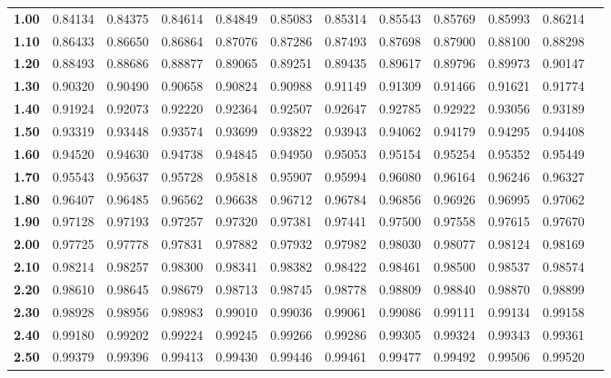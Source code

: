 \documentclass[a4paper]{article}
\begin{document}
\begin{tabular}{l|lllllllllll}
\bfseries  1.00&   0.84134&   0.84375&   0.84614&   0.84849&   0.85083&   0.85314&   0.85543&   0.85769&   0.85993&   0.86214&\\ 
\bfseries  1.10&   0.86433&   0.86650&   0.86864&   0.87076&   0.87286&   0.87493&   0.87698&   0.87900&   0.88100&   0.88298&\\
\bfseries  1.20&   0.88493&   0.88686&   0.88877&   0.89065&   0.89251&   0.89435&   0.89617&   0.89796&   0.89973&   0.90147&\\
\bfseries  1.30&   0.90320&   0.90490&   0.90658&   0.90824&   0.90988&   0.91149&   0.91309&   0.91466&   0.91621&   0.91774&\\ 
\bfseries  1.40&   0.91924&   0.92073&   0.92220&   0.92364&   0.92507&   0.92647&   0.92785&   0.92922&   0.93056&   0.93189&\\ \hline
\bfseries  1.50&   0.93319&   0.93448&   0.93574&   0.93699&   0.93822&   0.93943&   0.94062&   0.94179&   0.94295&   0.94408&\\
\bfseries  1.60&   0.94520&   0.94630&   0.94738&   0.94845&   0.94950&   0.95053&   0.95154&   0.95254&   0.95352&   0.95449&\\ 
\bfseries  1.70&   0.95543&   0.95637&   0.95728&   0.95818&   0.95907&   0.95994&   0.96080&   0.96164&   0.96246&   0.96327&\\
\bfseries  1.80&   0.96407&   0.96485&   0.96562&   0.96638&   0.96712&   0.96784&   0.96856&   0.96926&   0.96995&   0.97062&\\ 
\bfseries  1.90&   0.97128&   0.97193&   0.97257&   0.97320&   0.97381&   0.97441&   0.97500&   0.97558&   0.97615&   0.97670&\\ \hline
\bfseries  2.00&   0.97725&   0.97778&   0.97831&   0.97882&   0.97932&   0.97982&   0.98030&   0.98077&   0.98124&   0.98169&\\
\bfseries  2.10&   0.98214&   0.98257&   0.98300&   0.98341&   0.98382&   0.98422&   0.98461&   0.98500&   0.98537&   0.98574&\\ 
\bfseries  2.20&   0.98610&   0.98645&   0.98679&   0.98713&   0.98745&   0.98778&   0.98809&   0.98840&   0.98870&   0.98899&\\
\bfseries  2.30&   0.98928&   0.98956&   0.98983&   0.99010&   0.99036&   0.99061&   0.99086&   0.99111&   0.99134&   0.99158&\\ 
\bfseries  2.40&   0.99180&   0.99202&   0.99224&   0.99245&   0.99266&   0.99286&   0.99305&   0.99324&   0.99343&   0.99361&\\ \hline
\bfseries  2.50&   0.99379&   0.99396&   0.99413&   0.99430&   0.99446&   0.99461&   0.99477&   0.99492&   0.99506&   0.99520&\\

\end{tabular}
\end{document}
